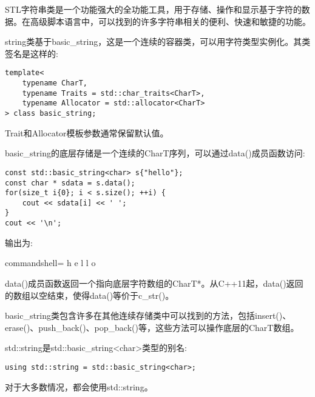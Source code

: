 STL字符串类是一个功能强大的全功能工具，用于存储、操作和显示基于字符的数据。在高级脚本语言中，可以找到的许多字符串相关的便利、快速和敏捷的功能。

string类基于basic\_string，这是一个连续的容器类，可以用字符类型实例化。其类签名是这样的:

\begin{lstlisting}[style=styleCXX]
template<
	typename CharT,
	typename Traits = std::char_traits<CharT>,
	typename Allocator = std::allocator<CharT>
> class basic_string;
\end{lstlisting}

Trait和Allocator模板参数通常保留默认值。

basic\_string的底层存储是一个连续的CharT序列，可以通过data()成员函数访问:

\begin{lstlisting}[style=styleCXX]
const std::basic_string<char> s{"hello"};
const char * sdata = s.data();
for(size_t i{0}; i < s.size(); ++i) {
	cout << sdata[i] << ' ';
}
cout << '\n';
\end{lstlisting}

输出为:

\begin{tcblisting}{commandshell={}}
h e l l o
\end{tcblisting}

data()成员函数返回一个指向底层字符数组的CharT*。从C++11起，data()返回的数组以空结束，使得data()等价于c\_str()。

basic\_string类包含许多在其他连续存储类中可以找到的方法，包括insert()、erase()、push\_back()、pop\_back()等，这些方法可以操作底层的CharT数组。

std::string是std::basic\_string<char>类型的别名:

\begin{lstlisting}[style=styleCXX]
using std::string = std::basic_string<char>;
\end{lstlisting}

对于大多数情况，都会使用std::string。


